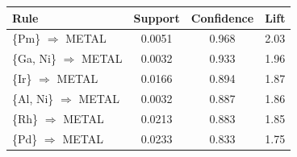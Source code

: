 \begin{tabular}{lccc}
\toprule
Rule & Support & Confidence & Lift\\
\midrule
\{Pm\} $\Rightarrow$ METAL & 0.0051 & 0.968 & 2.03 \\
\{Ga, Ni\} $\Rightarrow$ METAL & 0.0032 & 0.933 & 1.96 \\
\{Ir\} $\Rightarrow$ METAL & 0.0166 & 0.894 & 1.87 \\
\{Al, Ni\} $\Rightarrow$ METAL & 0.0032 & 0.887 & 1.86 \\
\{Rh\} $\Rightarrow$ METAL & 0.0213 & 0.883 & 1.85 \\
\{Pd\} $\Rightarrow$ METAL & 0.0233 & 0.833 & 1.75 \\
\bottomrule
\end{tabular}
